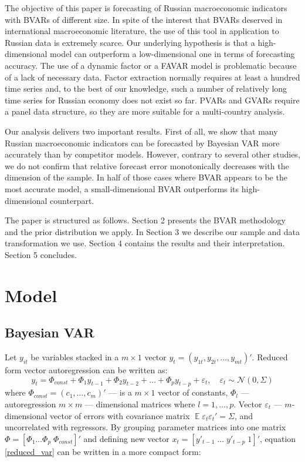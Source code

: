 \documentclass[11pt]{article} %
\DeclareMathOperator{\E}{\mathbb{E}}
\newcommand{\cN}{\mathcal{N}}
\begin{document}
The objective of this paper is forecasting of  Russian macroeconomic indicators with BVARs of different size. In spite of the interest that BVARs deserved in international macroeconomic literature, the use of this tool in application to Russian data is extremely scarce. Our underlying hypothesis is that a high-dimensional model can outperform a low-dimensional one in terms of forecasting accuracy. The use of a dynamic factor or a FAVAR model is problematic because of a lack of necessary data. Factor extraction normally  requires at least a hundred time series and, to the best of our knowledge, such a number of relatively long time series for Russian economy does not exist so far. PVARs and GVARs require a panel data structure, so they are more suitable for a multi-country analysis.

Our analysis delivers two important results. First of all, we show that many Russian macroeconomic indicators can be forecasted by Bayesian VAR more accurately than by competitor models. However, contrary to several other studies, we do not confirm that relative forecast error monotonically decreases with the dimension of the sample. In half of those cases where BVAR appears to be the most accurate model, a small-dimensional BVAR outperforms its high-dimensional counterpart. 
 
The paper is structured as follows. Section 2 presents the BVAR methodology and the prior distribution we apply. In Section 3 we describe our sample and data transformation we use. Section 4 contains the results and their interpretation.  Section 5 concludes.


\section{Model}

\subsection{Bayesian VAR}
Let $y_{it}$ be variables stacked in a  $m\times 1$ vector $y_{t}=(y_{1t},y_{2t},\ldots, y_{mt})'$. Reduced form vector autoregression can be written as:
\begin{equation}
y_t =\Phi_{const}+ \Phi_1 y_{t-1} + \Phi_2 y_{t-2} +\ldots + \Phi_p y_{t-p} + \varepsilon_t,\quad \varepsilon_t\sim \cN(0,\Sigma)\label{reduced_var}
\end{equation}
where $\Phi_{const}=(c_1,\ldots ,c_m)'$ --- is a $m\times 1$  vector of constants, $\Phi_l$ --– autoregression   $m\times m$ --- dimensional matrices where $l=1, \ldots, p$. Vector $\varepsilon_t$ --- $m$-dimensional vector of errors with  covariance matrix $\E\varepsilon_t \varepsilon _t'=\Sigma$, and uncorrelated with regressors.
By grouping parameter matrices into one matrix  $\Phi=[\Phi_1 \ldots \Phi_p \; \Phi_{const}]'$ %
and defining new vector $x_t=[ y'_{t-1}\;  \ldots  \; y'_{t-p} \; 1]'$, equation \eqref{reduced_var} can be written in a more compact form:
\end{document}
